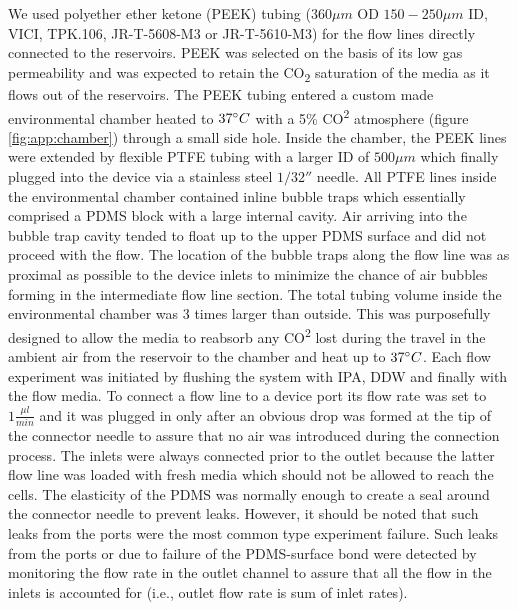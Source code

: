 We used polyether ether ketone (PEEK) tubing (\(360 \mu m\) OD \(150-250 \mu m\) ID, VICI, TPK.106, JR-T-5608-M3 or JR-T-5610-M3)
for the flow lines directly connected to the reservoirs. PEEK was selected on the basis of its low gas permeability and was expected to retain the CO\textsubscript{2} saturation of the media as it flows out of the reservoirs. The PEEK tubing entered a custom made environmental chamber heated to \(37\degree C\) with a 5\% CO\textsuperscript{2} atmosphere (figure \ref{fig:app:chamber}) through a small side hole. Inside the chamber, the PEEK lines were extended by flexible PTFE tubing with a larger ID of \(500\mu m\) which finally plugged into the device via a stainless steel \(1/32''\) needle. All PTFE lines inside the environmental chamber contained inline bubble traps which essentially comprised a PDMS block with a large internal cavity. Air arriving into the bubble trap cavity tended to float up to the upper PDMS surface and did not proceed with the flow. The location of the bubble traps along the flow line was as proximal as possible to the device inlets to minimize the chance of air bubbles forming in the intermediate flow line section. The total tubing volume inside the environmental chamber was 3 times larger than outside. This was purposefully designed to allow the media to reabsorb any CO\textsuperscript{2} lost during the travel in the ambient air from the reservoir to the chamber and heat up to \(37\degree C\). Each flow experiment was initiated by flushing the system with IPA, DDW and finally with the flow media. To connect a flow line to a device port its flow rate was set to \(1\frac{\mu l}{min}\) and it was plugged in only after an obvious drop was formed at the tip of the connector needle to assure that no air was introduced during the connection process. The inlets were always connected prior to the outlet because the latter flow line was loaded with fresh media which should not be allowed to reach the cells. The elasticity of the PDMS was normally enough to create a seal around the connector needle to prevent leaks. However, it should be noted that such leaks from the ports were the most common type experiment failure. Such leaks from the ports or due to failure of the PDMS-surface bond were detected by monitoring the flow rate in the outlet channel to assure that all the flow in the inlets is accounted for (i.e., outlet flow rate is sum of inlet rates).

